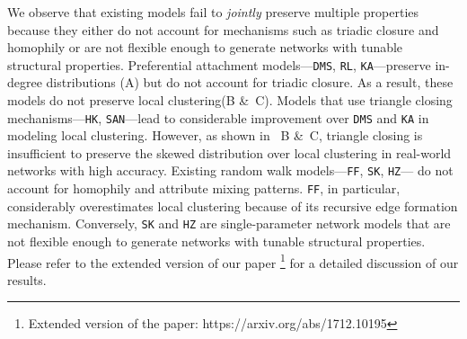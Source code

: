 

We observe that existing models fail to \textit{jointly} preserve multiple properties
because they either do not account for mechanisms such as triadic closure and homophily
or are not flexible enough to generate networks with tunable structural properties.
Preferential attachment models---\texttt{DMS}, \texttt{RL}, \texttt{KA}---preserve in-degree
distributions (A) but do not account for triadic closure. As a result, these models
do not preserve local clustering(B \&~C).
Models that use triangle closing mechanisms---\texttt{HK}, \texttt{SAN}---lead to considerable improvement
over \texttt{DMS} and \texttt{KA} in modeling local clustering. However, as shown in ~B \&~C, triangle closing is insufficient to preserve the skewed distribution over local
clustering in real-world networks with high accuracy.
Existing random walk models---\texttt{FF}, \texttt{SK}, \texttt{HZ}---
do not account for homophily and attribute mixing patterns.
\texttt{FF}, in particular, considerably overestimates local clustering because of its recursive edge
formation mechanism.
Conversely, \texttt{SK} and \texttt{HZ} are single-parameter network models that are not flexible
enough to generate networks with tunable structural properties. Please refer to the extended version of
our paper \footnote{\label{ft1} Extended version of the paper: https://arxiv.org/abs/1712.10195} for a detailed discussion of our results.


